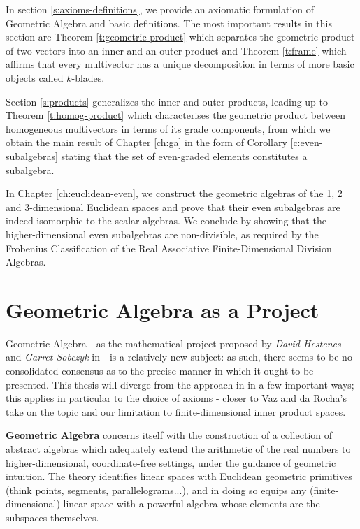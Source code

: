 In section \ref{s:axioms-definitions}, we provide an axiomatic formulation of Geometric Algebra and basic definitions. The most important results in this section are Theorem \ref{t:geometric-product} which separates the geometric product of two vectors into an inner and an outer product and Theorem \ref{t:frame} which affirms that every multivector has a unique decomposition in terms of more basic objects called $k$-blades.

Section \ref{s:products} generalizes the inner and outer products, leading up to Theorem \ref{t:homog-product} which characterises the geometric product between homogeneous multivectors in terms of its grade components, from which we obtain the main result of Chapter \ref{ch:ga} in the form of Corollary \ref{c:even-subalgebras} stating that the set of even-graded elements constitutes a subalgebra.

In Chapter \ref{ch:euclidean-even}, we construct the geometric algebras of the 1, 2 and 3-dimensional Euclidean spaces and prove that their even subalgebras are indeed isomorphic to the scalar algebras. We conclude by showing that the higher-dimensional even subalgebras are non-divisible, as required by the Frobenius Classification of the Real Associative Finite-Dimensional Division Algebras.


\section{Geometric Algebra as a Project}
Geometric Algebra - as the mathematical project proposed by \textit{David Hestenes} and \textit{Garret Sobczyk} in \cite{ga-origin} - is a relatively new subject: as such, there seems to be no consolidated consensus as to the precise manner in which it ought to be presented. This thesis will diverge from the approach in \cite{ga-origin} in a few important ways; this applies in particular to the choice of axioms - closer to Vaz and da Rocha's take on the topic \cite{clifford-algebra} and our limitation to finite-dimensional inner product spaces.

\textbf{Geometric Algebra} concerns itself with the construction of a collection of abstract algebras which adequately extend the arithmetic of the real numbers to higher-dimensional, coordinate-free settings, under the guidance of geometric intuition. The theory identifies linear spaces with Euclidean geometric primitives (think points, segments, parallelograms...), and in doing so equips any (finite-dimensional) linear space with a powerful algebra whose elements are the subspaces themselves.

